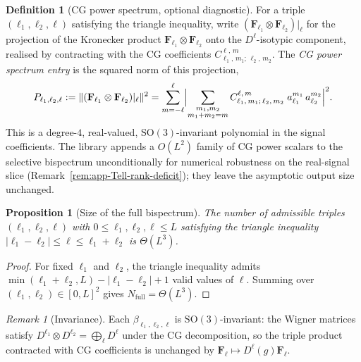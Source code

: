 \documentclass{article}
\newtheorem{proposition}[theorem]{Proposition}
\theoremstyle{definition}
\newtheorem{definition}[theorem]{Definition}
\theoremstyle{remark}
\newtheorem{remark}[theorem]{Remark}
\newcommand{\SO}{\mathrm{SO}}
\newcommand{\CG}[6]{C^{#5,\,#6}_{#1,\,#2;\,#3,\,#4}}
\theoremstyle{definition}
\begin{document}
\begin{definition}[CG power spectrum, optional diagnostic]\label{def:app-cg-power}
For a triple $(\ell_1, \ell_2, \ell)$ satisfying the triangle
inequality, write
$(\mathbf{F}_{\ell_1} \otimes \mathbf{F}_{\ell_2})\big|_\ell$
for the projection of the Kronecker product
$\mathbf{F}_{\ell_1} \otimes \mathbf{F}_{\ell_2}$ onto the
$D^\ell$-isotypic component, realised by contracting with the CG
coefficients $\CG{\ell_1}{m_1}{\ell_2}{m_2}{\ell}{m}$. The
\emph{CG power spectrum entry} is the squared norm of this projection,
\begin{equation}\label{eq:app-cg-power}
  P_{\ell_1,\ell_2,\ell}
  := \lVert (\mathbf{F}_{\ell_1} \otimes \mathbf{F}_{\ell_2})|_\ell
     \rVert^2
  = \sum_{m=-\ell}^{\ell}
    \Bigl\lvert \sum_{\substack{m_1,m_2 \\ m_1+m_2=m}}
      \CG{\ell_1}{m_1}{\ell_2}{m_2}{\ell}{m}\;
      a_{\ell_1}^{m_1}\, a_{\ell_2}^{m_2} \Bigr\rvert^2.
\end{equation}
This is a degree-$4$, real-valued, $\SO(3)$-invariant polynomial in
the signal coefficients. The library appends a $O(L^2)$ family of CG
power scalars to the selective bispectrum unconditionally for
numerical robustness on the real-signal slice
(Remark~\ref{rem:app-Tell-rank-deficit}); they leave the asymptotic
output size unchanged.
\end{definition}

\begin{proposition}[Size of the full bispectrum]\label{prop:app-full-size}
The number of admissible triples $(\ell_1, \ell_2, \ell)$ with
$0 \le \ell_1, \ell_2, \ell \le L$ satisfying the triangle inequality
$|\ell_1 - \ell_2| \le \ell \le \ell_1 + \ell_2$ is $\Theta(L^3)$.
\end{proposition}
\begin{proof}
For fixed $\ell_1$ and $\ell_2$, the triangle inequality admits
$\min(\ell_1 + \ell_2, L) - |\ell_1 - \ell_2| + 1$ valid values of
$\ell$. Summing over $(\ell_1,\ell_2)\in[0,L]^2$ gives
$N_{\mathrm{full}} = \Theta(L^3)$.
\end{proof}

\begin{remark}[Invariance]
Each $\beta_{\ell_1,\ell_2,\ell}$ is $\SO(3)$-invariant: the Wigner
matrices satisfy $D^{\ell_1} \otimes D^{\ell_2}
= \bigoplus_\ell D^\ell$ under the CG decomposition, so the triple
product contracted with CG coefficients is unchanged by
$\mathbf{F}_\ell \mapsto D^\ell(g)\mathbf{F}_\ell$.
\end{remark}
\end{document}
